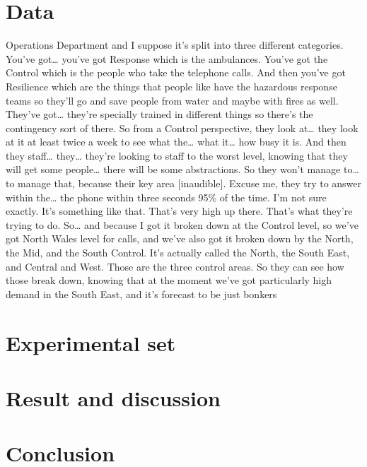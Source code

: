 \documentclass[
  authoryear,
  preprint,
  3p]{elsarticle}
\begin{document}
\hypertarget{data}{%
\section{Data}\label{data}}

Operations Department and I suppose it's split into three different
categories. You've got\ldots{} you've got Response which is the
ambulances. You've got the Control which is the people who take the
telephone calls. And then you've got Resilience which are the things
that people like have the hazardous response teams so they'll go and
save people from water and maybe with fires as well. They've got\ldots{}
they're specially trained in different things so there's the contingency
sort of there. So from a Control perspective, they look at\ldots{} they
look at it at least twice a week to see what the\ldots{} what it\ldots{}
how busy it is. And then they staff\ldots{} they\ldots{} they're looking
to staff to the worst level, knowing that they will get some
people\ldots{} there will be some abstractions. So they won't manage
to\ldots{} to manage that, because their key area {[}inaudible{]}.
Excuse me, they try to answer within the\ldots{} the phone within three
seconds 95\% of the time. I'm not sure exactly. It's something like
that. That's very high up there. That's what they're trying to do.
So\ldots{} and because I got it broken down at the Control level, so
we've got North Wales level for calls, and we've also got it broken down
by the North, the Mid, and the South Control. It's actually called the
North, the South East, and Central and West. Those are the three control
areas. So they can see how those break down, knowing that at the moment
we've got particularly high demand in the South East, and it's forecast
to be just bonkers

\hypertarget{design}{%
\section{Experimental set}\label{design}}

\hypertarget{result}{%
\section{Result and discussion}\label{result}}

\hypertarget{conclusion}{%
\section{Conclusion}\label{conclusion}}


\renewcommand\refname{References}
  
\end{document}
